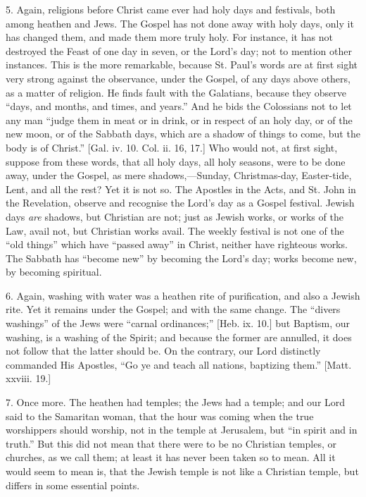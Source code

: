 5. Again, religions before Christ came ever had holy days and
festivals, both among heathen and Jews. The Gospel has not done away
with holy days, only it has changed them, and made them more truly
holy. For instance, it has not destroyed the Feast of one day in
seven, or the Lord's day; not to mention other instances. This is the
more remarkable, because St. Paul's words are at first sight very
strong against the observance, under the Gospel, of any days above
others, as a matter of religion. He finds fault with the Galatians,
because they observe ``days, and months, and times, and
years.'' And he bids the Colossians not to let any man ``judge
them in meat or in drink, or in respect of an holy day, or of the new
moon, or of the Sabbath days, which are a shadow of things to come,
but the body is of Christ.'' [Gal. iv. 10. Col. ii. 16, 17.] Who
would not, at first sight, suppose from these words, that all holy
days, all holy seasons, were to be done away, under the Gospel, as
mere shadows,—Sunday, Christmas-day, Easter-tide, Lent, and all the
rest? Yet it is not so. The Apostles in the Acts, and St. John in the
Revelation, observe and recognise the Lord's day as a Gospel festival.
Jewish days \emph{are} shadows, but Christian are not; just as Jewish
works, or works of the Law, avail not, but Christian works avail. The
weekly festival is not one of the ``old things'' which have
``passed away'' in Christ, neither have righteous works. The
Sabbath has ``become new'' by becoming the Lord's day; works
become new, by becoming spiritual.

6. Again, washing with water was a heathen rite of purification,
and also a Jewish rite. Yet it remains under the Gospel; and with the
same change. The ``divers washings'' of the Jews were
``carnal ordinances;'' [Heb. ix. 10.] but Baptism, our
washing, is a washing of the Spirit; and because the former are
annulled, it does not follow that the latter should be. On the
contrary, our Lord distinctly commanded His Apostles, ``Go ye and
teach all nations, baptizing them.'' [Matt. xxviii. 19.]

7. Once more. The heathen had temples; the Jews had a temple; and
our Lord said to the Samaritan woman, that the hour was coming when
the true worshippers should worship, not in the temple at Jerusalem,
but ``in spirit and in truth.'' But this did not mean that
there were to be no Christian temples, or churches, as we call them;
at least it has never been taken so to mean. All it would seem to mean
is, that the Jewish temple is not like a Christian temple, but differs
in some essential points.

